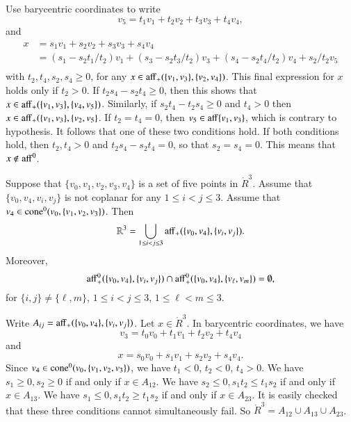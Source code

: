 \begin{tarskidata}
\begin{tarski}
\begin{proved}
Use barycentric coordinates to write
   $$
   v_5 = t_1 v_1 + t_2 v_2 + t_3 v_3 + t_4 v_4,
   $$
and 
    $$
    \begin{array}{lll}
    x &= s_1 v_1 + s_2 v_2 + s_3 v_3 + s_4 v_4 \\
      &= (s_1 - s_2 t_1/t_2) v_1 + (s_3 - s_2 t_3/t_2) v_3 +
        (s_4 - s_2 t_4/t_2) v_4 + s_2/t_2 v_5\\
    \end{array}
    $$
with $t_2,t_4,s_2,s_4\ge 0$,
for any $x\in{\operatorname{aff}}_+(\{v_1,v_3\},\{v_2,v_4\})$. 
This final expression for $x$ holds only if $t_2>0$.   
If $t_2 s_4 - s_2 t_4 \ge 0$, then this shows that 
$x\in{\operatorname{aff}}_+(\{v_1,v_3\},\{v_4,v_5\})$.
Similarly, if $s_2 t_4 - t_2 s_4\ge 0$ and $t_4>0$ then
$x\in{\operatorname{aff}}_+(\{v_1,v_3\},\{v_2,v_5\}$.
If $t_2=t_4=0$, then $v_5\in{\operatorname{aff}}\{v_1,v_3\}$, which is
contrary to hypothesis.  It follows that one of these two
conditions hold.  If both conditions hold, then $t_2,t_4>0$
and $t_2 s_4 - s_2 t_4 =0$, so that $s_2=s_4 = 0$.  This means
that $x\not\in{\operatorname{aff}}^0$.
\swallowed\end{proved}
\end{tarski}





\begin{tarski}

\begin{lemma}
Suppose that $\{v_0,v_1,v_2,v_3,v_4\}$ is a set
of five points in $\ring{R}^3$.  Assume that $\{v_0,v_4,v_i,v_j\}$
is not coplanar for any $1\le i < j \le 3$.
Assume that $v_4\in{\operatorname{cone}}^0(v_0,\{v_1,v_2,v_3\})$.
Then 
   $$
   \mathbb{R}^3 = \bigcup_{1\le i<j\le 3}
    {\operatorname{aff}}_+(\{v_0,v_4\},\{v_i,v_j\}).
   $$
Moreover,
   $$
   {\operatorname{aff}}_+^0(\{v_0,v_4\},\{v_i,v_j\}) \cap
   {\operatorname{aff}}_+^0(\{v_0,v_4\},\{v_\ell,v_m\}) =\emptyset,
   $$
for $\{i,j\}\ne \{\ell,m\}$, $1\le i<j\le 3$, $1\le \ell<m\le 3$.
\end{lemma}

\begin{proved} Write $A_{ij} = {\operatorname{aff}}_+(\{v_0,v_4\},\{v_i,v_j\})$.
  Let $x\in\ring{R}^3$.  In barycentric coordinates, we have
  $$
  v_3 = t_0 v_0 + t_1 v_1 + t_2 v_2 + t_4 v_4
  $$
and
$$
  x = s_0 v_0 + s_1 v_1 + s_2 v_2 + s_4 v_4.
$$
Since $v_4\in{\operatorname{cone}}^0(v_0,\{v_1,v_2,v_3\})$, we have
$t_1<0$, $t_2<0$, $t_4>0$.  
We have $s_1\ge0,s_2\ge0$ if and only if $x\in A_{12}$.
We have $s_2\le0,s_1t_2\le t_1s_2$ if and only if $x\in A_{13}$.
We have $s_1\le0,s_1t_2\ge t_1s_2$ if and only if $x\in A_{23}$.
It is easily checked that these three conditions cannot simultaneously
fail.  So $\ring{R}^3 = A_{12}\cup A_{13}\cup A_{23}$.


\end{proved}
\end{tarski}
\end{tarskidata}
